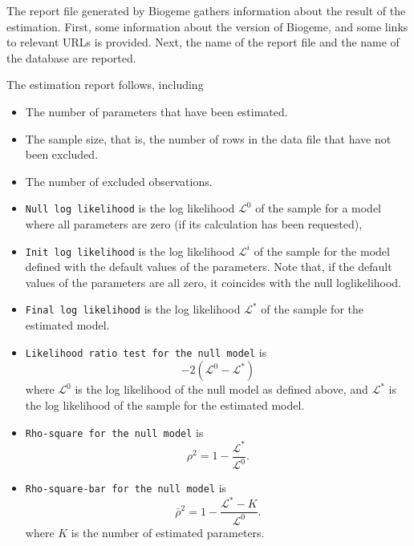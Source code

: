\documentclass[12pt,a4paper]{article}
\begin{document}
The report file generated by Biogeme gathers information
about the result of the estimation. First, some information about the
version of Biogeme, and some links to relevant URLs is provided. 
Next, the name of the report file and the name of the database  are reported. 

The estimation report follows, including
   \begin{itemize}
      \item The number of parameters that have been estimated.
      \item The sample size, that is, the number of rows in
        the data file  that have not been excluded.
      \item The number of excluded observations.
      \item \texttt{Null log likelihood} is the log likelihood
        $\mathcal{L}^0$ of
        the sample for a model where all parameters are zero (if its calculation has been requested),
      \item \texttt{Init log likelihood} is the log likelihood
        $\mathcal{L}^i$ of
        the sample for the model defined with the default values of
        the parameters. Note that, if the default values of the parameters are all zero, it coincides with the null loglikelihood.
      \item \texttt{Final log likelihood} is the log likelihood
        $\mathcal{L}^*$ of the sample for the estimated model. 
      \item \texttt{Likelihood ratio test for the null model} is 
         \begin{equation}
            -2 ( \mathcal{L}^0 - \mathcal{L}^*)
         \end{equation}
         where 
         $ \mathcal{L}^0$ is the log likelihood of the null model
         as defined above, and $\mathcal{L}^*$ is the log likelihood of the sample for the estimated model. 
      \item \texttt{Rho-square for the null model} is
         \begin{equation}
            \rho^2 = 1 - \frac{\mathcal{L}^*}{\mathcal{L}^0}.
         \end{equation}
        \item \texttt{Rho-square-bar for the null model} is
         \begin{equation}
            \bar{\rho}^2 = 1 - \frac{\mathcal{L}^* - K}{\mathcal{L}^0}.
         \end{equation}
         where $K$ is the number of estimated parameters.

\end{itemize}
\end{document}
